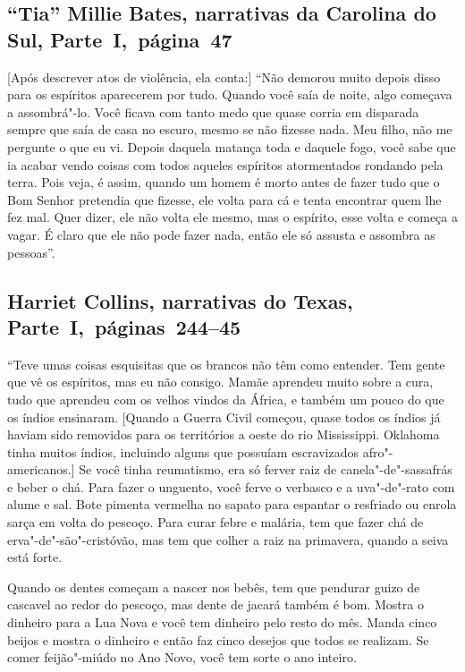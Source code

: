 \subsection{``Tia'' Millie Bates, narrativas da Carolina do Sul, Parte~I,~página~47} \label{ref21}

{[}Após descrever atos de violência, ela conta:{]} ``Não demorou muito
depois disso para os espíritos aparecerem por tudo. Quando você saía de
noite, algo começava a assombrá"-lo. Você ficava com tanto medo que quase
corria em disparada sempre que saía de casa no escuro, mesmo se não
fizesse nada. Meu filho, não me pergunte o que eu vi. Depois daquela
matança toda e daquele fogo, você sabe que ia acabar vendo coisas com
todos aqueles espíritos atormentados rondando pela terra. Pois veja, é
assim, quando um homem é morto antes de fazer tudo que o Bom Senhor
pretendia que fizesse, ele volta para cá e tenta encontrar quem lhe fez
mal. Quer dizer, ele não volta ele mesmo, mas o espírito, esse volta e
começa a vagar. É claro que ele não pode fazer nada, então ele só
assusta e assombra as pessoas''.

\subsection{Harriet Collins, narrativas do Texas, Parte~I,~páginas~244--45} \label{ref58}

``Teve umas coisas esquisitas que os brancos não têm como entender. Tem
gente que vê os espíritos, mas eu não consigo. Mamãe aprendeu muito
sobre a cura, tudo que aprendeu com os velhos vindos da África, e também
um pouco do que os índios ensinaram. {[}Quando a Guerra Civil começou,
quase todos os índios já haviam sido removidos para os territórios a
oeste do rio Mississippi. Oklahoma tinha muitos índios, incluindo alguns
que possuíam escravizados afro"-americanos.{]} Se você tinha reumatismo, era
só ferver raiz de canela"-de"-sassafrás e beber o chá. Para fazer o
unguento, você ferve o verbasco e a uva"-de"-rato com alume e sal. Bote
pimenta vermelha no sapato para espantar o resfriado ou enrola sarça em
volta do pescoço. Para curar febre e malária, tem que fazer chá de
erva"-de"-são"-cristóvão, mas tem que colher a raiz na primavera, quando a
seiva está forte.

Quando os dentes começam a nascer nos bebês, tem que pendurar guizo de
cascavel ao redor do pescoço, mas dente de jacará também é bom. Mostra o
dinheiro para a Lua Nova e você tem dinheiro pelo resto do mês. Manda
cinco beijos e mostra o dinheiro e então faz cinco desejos que todos se
realizam. Se comer feijão"-miúdo no Ano Novo, você tem sorte o ano
inteiro.

